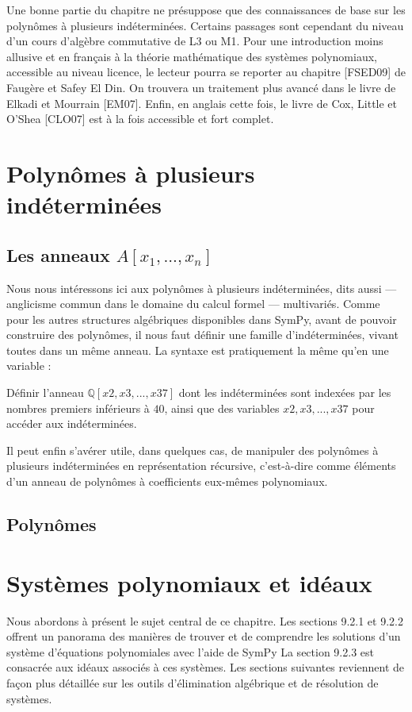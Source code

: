 Une bonne partie du chapitre ne présuppose que des connaissances de base sur les polynômes à plusieurs indéterminées. Certains passages sont cependant du niveau d’un cours d’algèbre commutative de L3 ou M1. Pour une introduction moins allusive et en français à la théorie mathématique des systèmes polynomiaux, accessible au niveau licence, le lecteur pourra se reporter au chapitre [FSED09] de Faugère et Safey El Din. On trouvera un traitement plus avancé dans le livre de Elkadi et Mourrain [EM07]. Enfin, en anglais cette fois, le livre de Cox, Little et O’Shea [CLO07] est à la fois accessible et fort complet.

\section{ Polynômes à plusieurs indéterminées}
 \subsection{ Les anneaux $A\left[x_{1}, ..., x_{n}\right]$}
 Nous nous intéressons ici aux polynômes à plusieurs indéterminées, dits aussi — anglicisme commun dans le domaine du calcul formel — multivariés. Comme pour les autres structures algébriques disponibles dans SymPy, avant de pouvoir construire des polynômes, il nous faut définir une famille d’indéterminées, vivant toutes dans un même anneau. La syntaxe est pratiquement la même qu’en une variable :

\begin{exercise}
Définir l’anneau $\mathbb{Q}\left[x2 , x3 , . . . , x37\right]$ dont les indéterminées sont indexées
par les nombres premiers inférieurs à $40$, ainsi que des variables $x2, x3, ..., x37$ pour
accéder aux indéterminées.
\end{exercise}

Il peut enfin s’avérer utile, dans quelques cas, de manipuler des polynômes à plusieurs indéterminées en 
représentation récursive, c’est-à-dire comme éléments d’un anneau de polynômes à coefficients eux-mêmes 
polynomiaux.

\subsection{Polynômes}
\section{Systèmes polynomiaux et idéaux}
Nous abordons à présent le sujet central de ce chapitre. Les sections 9.2.1 et 9.2.2 offrent un panorama des manières de trouver et de comprendre les solutions d’un système d’équations polynomiales avec l’aide de SymPy La section 9.2.3 est consacrée aux idéaux associés à ces systèmes. Les sections suivantes reviennent
de façon plus détaillée sur les outils d’élimination algébrique et de résolution de
systèmes.
